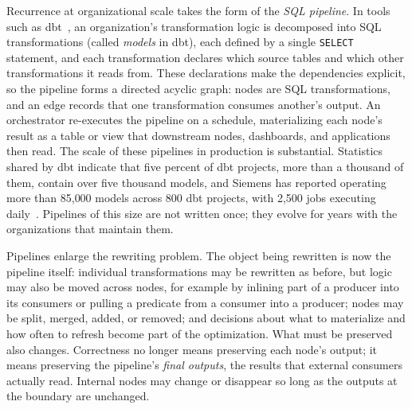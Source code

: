 Recurrence at organizational scale takes the form of the \emph{SQL
pipeline}. In tools such as dbt~\cite{dbtWhatExactly}, an
organization's transformation logic is decomposed into SQL
transformations (called \emph{models} in dbt), each defined by a
single \texttt{SELECT} statement, and each transformation declares
which source tables and which other transformations it reads from.
These declarations make the dependencies explicit, so the pipeline
forms a directed acyclic graph: nodes are SQL transformations, and an
edge records that one transformation consumes another's output. An
orchestrator re-executes the pipeline on a schedule, materializing
each node's result as a table or view that downstream nodes,
dashboards, and applications then read. The scale of these pipelines
in production is substantial. Statistics shared by dbt indicate that
five percent of dbt projects, more than a thousand of them, contain
over five thousand models, and Siemens has reported operating more
than 85{,}000 models across 800 dbt projects, with 2{,}500 jobs
executing daily~\cite{dengsoe2023large}. Pipelines of this size are
not written once; they evolve for years with the organizations that
maintain them.

Pipelines enlarge the rewriting problem. The object being rewritten
is now the pipeline itself: individual transformations may be
rewritten as before, but logic may also be moved across nodes, for
example by inlining part of a producer into its consumers or pulling
a predicate from a consumer into a producer; nodes may be split,
merged, added, or removed; and decisions about what to materialize
and how often to refresh become part of the optimization. What must
be preserved also changes. Correctness no longer means preserving
each node's output; it means preserving the pipeline's \emph{final
outputs}, the results that external consumers actually read.
Internal nodes may change or disappear so long as the outputs at the
boundary are unchanged.

